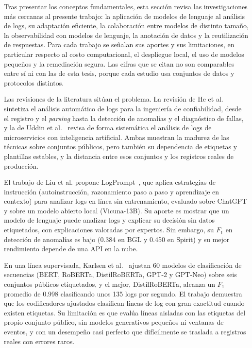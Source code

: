 Tras presentar los conceptos fundamentales, esta sección revisa las investigaciones más cercanas al presente trabajo: la aplicación de modelos de lenguaje al análisis de logs, su adaptación eficiente, la colaboración entre modelos de distinto tamaño, la observabilidad con modelos de lenguaje, la anotación de datos y la reutilización de respuestas. Para cada trabajo se señalan sus aportes y sus limitaciones, en particular respecto al costo computacional, el despliegue local, el uso de modelos pequeños y la remediación segura. Las cifras que se citan no son comparables entre sí ni con las de esta tesis, porque cada estudio usa conjuntos de datos y protocolos distintos.

Las revisiones de la literatura sitúan el problema. La revisión de He et al.~\cite{he2021_survey} sintetiza el análisis automático de logs para la ingeniería de confiabilidad, desde el registro y el \textit{parsing} hasta la detección de anomalías y el diagnóstico de fallas, y la de Uddin et al.~\cite{uddin2026_microservice_logs} revisa de forma sistemática el análisis de logs de microservicios con inteligencia artificial. Ambas muestran la madurez de las técnicas sobre conjuntos públicos, pero también su dependencia de etiquetas y plantillas estables, y la distancia entre esos conjuntos y los registros reales de producción.

El trabajo de Liu et al. propone LogPrompt~\cite{liu2024_logprompt}, que aplica estrategias de instrucción (autoinstrucción, razonamiento paso a paso y aprendizaje en contexto) para analizar logs en línea sin entrenamiento, evaluado sobre ChatGPT y sobre un modelo abierto local (Vicuna-13B). Su aporte es mostrar que un modelo de lenguaje puede analizar logs y explicar su decisión sin datos etiquetados, con explicaciones valoradas por expertos. Sin embargo, su $F_1$ en detección de anomalías es bajo (0.384 en BGL y 0.450 en Spirit) y su mejor rendimiento depende de una API en la nube.

En una línea supervisada, Karlsen et al.~\cite{karlsen2024_benchmark} ajustan 60 modelos de clasificación de secuencias (BERT, RoBERTa, DistilRoBERTa, GPT-2 y GPT-Neo) sobre seis conjuntos públicos etiquetados, y el mejor, DistilRoBERTa, alcanza un $F_1$ promedio de 0.998 clasificando unos 135 logs por segundo. El trabajo demuestra que los codificadores ajustados clasifican líneas de log con gran exactitud cuando existen etiquetas. Su limitación es que evalúa líneas aisladas con las etiquetas del propio conjunto público, sin modelos generativos pequeños ni ventanas de eventos, y con un desempeño casi perfecto que difícilmente se traslada a registros reales con errores raros.

